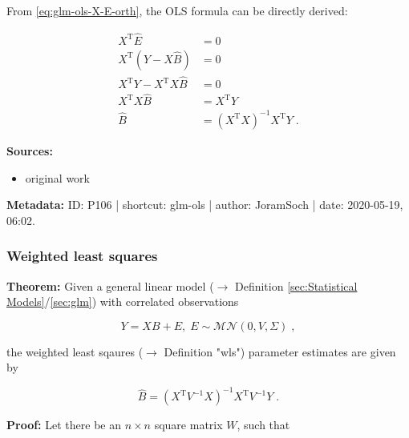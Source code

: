 \documentclass[a4paper,12pt,twoside]{book}
\begin{document}
From \eqref{eq:glm-ols-X-E-orth}, the OLS formula can be directly derived:

\begin{equation} \label{eq:glm-ols-OLS-qed}
\begin{split}
X^\mathrm{T} \hat{E} &= 0 \\
X^\mathrm{T} \left( Y - X\hat{B} \right) &= 0 \\
X^\mathrm{T} Y - X^\mathrm{T} X\hat{B} &= 0 \\
X^\mathrm{T} X\hat{B} &= X^\mathrm{T} Y \\
\hat{B} &= (X^\mathrm{T} X)^{-1} X^\mathrm{T} Y \; .
\end{split}
\end{equation}


\vspace{1em}
\textbf{Sources:}
\begin{itemize}
\item original work\end{itemize}


\vspace{1em}
\textbf{Metadata:} ID: P106 | shortcut: glm-ols | author: JoramSoch | date: 2020-05-19, 06:02.
\vspace{1em}



\subsubsection[\textbf{Weighted least squares}]{Weighted least squares} \label{sec:glm-wls}
\setcounter{equation}{0}

\textbf{Theorem:} Given a general linear model ($\rightarrow$ Definition \ref{sec:Statistical Models}/\ref{sec:glm}) with correlated observations

\begin{equation} \label{eq:glm-wls-GLM}
Y = X B + E, \; E \sim \mathcal{MN}(0, V, \Sigma) \; ,
\end{equation}

the weighted least sqaures ($\rightarrow$ Definition "wls") parameter estimates are given by

\begin{equation} \label{eq:glm-wls-WLS}
\hat{B} = (X^\mathrm{T} V^{-1} X)^{-1} X^\mathrm{T} V^{-1} Y \; .
\end{equation}


\vspace{1em}
\textbf{Proof:} Let there be an $n \times n$ square matrix $W$, such that
\end{document}
